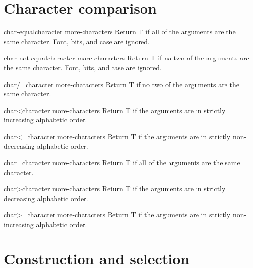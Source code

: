 \documentclass[10pt,english]{book}
\begin{document}
\section{Character comparison}
\label{sec:character-comparison}

\begin{function}{char-equal}{character \rest more-characters}
  Return T if all of the arguments are the same character.
  Font, bits, and case are ignored.
\end{function}

\begin{function}{char-not-equal}{character \rest more-characters}
  Return T if no two of the arguments are the same character.
   Font, bits, and case are ignored.
\end{function}

\begin{function}{char/=}{character \rest more-characters}
  Return T if no two of the arguments are the same character.
\end{function}

\begin{function}{char<}{character \rest more-characters}
  Return T if the arguments are in strictly increasing alphabetic order.
\end{function}

\begin{function}{char<=}{character \rest more-characters}
  Return T if the arguments are in strictly non-decreasing alphabetic order.
\end{function}

\begin{function}{char=}{character \rest more-characters}
  Return T if all of the arguments are the same character.
\end{function}

\begin{function}{char>}{character \rest more-characters}
  Return T if the arguments are in strictly decreasing alphabetic order.
\end{function}

\begin{function}{char>=}{character \rest more-characters}
  Return T if the arguments are in strictly non-increasing alphabetic order.
\end{function}

\section{Construction and selection}
\label{sec:character-constr-select}
\end{document}
